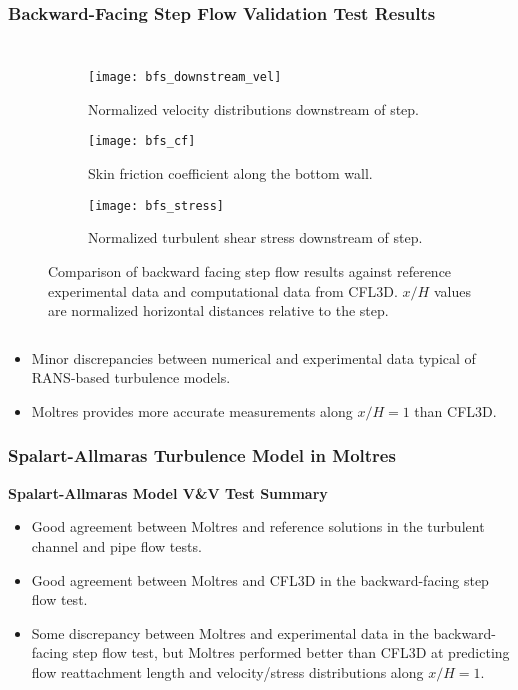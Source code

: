\begin{frame}
  \frametitle{Backward-Facing Step Flow Validation Test Results}
  \begin{columns}
    \column{11.5cm}
    \begin{figure}[htb]
      \centering
      \begin{subfigure}[t]{0.32\columnwidth}
        \centering
        \texttt{[image: bfs\_downstream\_vel]}
        \caption{Normalized velocity distributions downstream of step.}
        \label{fig:bfs-downstream}
      \end{subfigure} %
      \begin{subfigure}[t]{0.32\columnwidth}
        \centering
        \texttt{[image: bfs\_cf]}
        \caption{Skin friction coefficient along the bottom wall.}
        \label{fig:bfs-cf}
      \end{subfigure}
      \begin{subfigure}[t]{0.32\columnwidth}
        \centering
        \texttt{[image: bfs\_stress]}
        \caption{Normalized turbulent shear stress downstream
        of step.}
        \label{fig:bfs-stress}
      \end{subfigure}
      \caption{Comparison of backward facing step flow results against reference
      experimental data and computational data from CFL3D. $x/H$ values are normalized horizontal
      distances relative to the step.}
      \label{fig:bfs-plots}
    \end{figure}
  \end{columns}
  \begin{itemize}
    \item Minor discrepancies between numerical and experimental data typical of RANS-based turbulence models.
    \item Moltres provides more accurate measurements along $x/H=1$ than CFL3D.
  \end{itemize}
\end{frame}

\begin{frame}
  \frametitle{Spalart-Allmaras Turbulence Model in Moltres}
  \begin{block}{\textbf{Spalart-Allmaras Model V\&V Test Summary}}
    \begin{itemize}
      \item Good agreement between Moltres and reference solutions in the turbulent channel and pipe
        flow tests.
      \item Good agreement between Moltres and CFL3D in the backward-facing step flow test.
      \item Some discrepancy between Moltres and experimental data in the backward-facing step flow
        test, but Moltres performed better than CFL3D at predicting flow reattachment length and
        velocity/stress distributions along $x/H=1$.
    \end{itemize}
  \end{block}
\end{frame}
